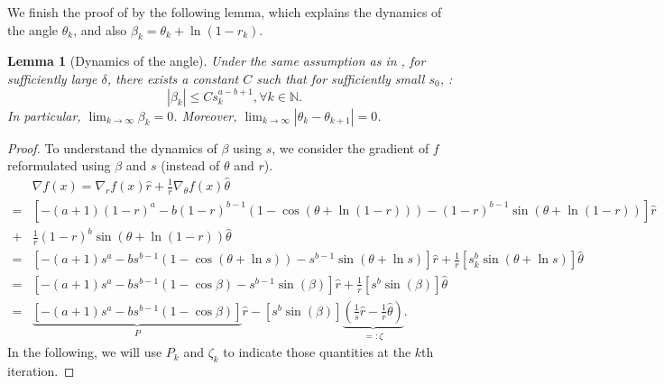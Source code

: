 \documentclass{article}
\theoremstyle{plain}
\newtheorem{lemma}[theorem]{Lemma}
\theoremstyle{definition}
\theoremstyle{remark}
\newcommand*{\NN}{\mathbb{N}}
\begin{document}
We finish the proof of  by the following lemma, which explains the dynamics of the angle $\theta_k$, and also $\beta_k = \theta_k + \ln(1 - r_k)$.
\begin{lemma}[Dynamics of the angle]
    \label{lemma:dynamics-angle}
    Under the same assumption as in , for sufficiently large $\delta$, there exists a constant $C$ such that for sufficiently small $s_0$, :
    \begin{equation*}
        |\beta_k| \leq C s_k^{a - b + 1}, \forall k \in \NN.
    \end{equation*}
    In particular, $\lim_{k \to \infty} \beta_k = 0$. Moreover, $\lim_{k \to \infty} |\theta_k - \theta_{k+1}| = 0$.
\end{lemma}
\begin{proof}
    To understand the dynamics of $\beta$ using $s$, we consider the gradient of $f$ reformulated using $\beta$ and $s$ (instead of $\theta$ and $r$).
    \begin{equation*}
        \begin{aligned}
            &\nabla f(x) = \nabla_r f(x) \hat{r} + \frac{1}{r} \nabla_\theta f(x) \hat{\theta}\\
            =& [-(a+1)(1 - r)^{a} - b(1-r)^{b-1}(1 - \cos(\theta + \ln(1 - r))) - (1 - r)^{b - 1}\sin(\theta + \ln(1 - r))] \hat{r} \\
            +& \frac{1}{r}(1 - r)^b \sin(\theta + \ln(1-r)) \hat{\theta}\\
            =& \left[-(a+1)s^{a} - bs^{b-1}(1 - \cos(\theta + \ln s)) - s^{b - 1}\sin(\theta + \ln s)\right] \hat{r} + \frac{1}{r}\left[s_k^b \sin(\theta + \ln s)\right] \hat{\theta}\\
            =& \left[-(a+1)s^{a} - bs^{b-1}(1 - \cos\beta) - s^{b - 1}\sin(\beta)\right] \hat{r} + \frac{1}{r}\left[s^b \sin(\beta)\right] \hat{\theta}\\
            =&\underbrace{\left[-(a+1)s^{a} - bs^{b-1}(1 - \cos\beta)\right]}_{P} \hat{r} - \left[s^b \sin(\beta)\right]\underbrace{\left(\frac{1}{s}\hat{r} - \frac{1}{r}\hat{\theta}\right)}_{=:\zeta}.
        \end{aligned}
    \end{equation*}
    In the following, we will use $P_k$ and $\zeta_k$ to indicate those quantities at the $k$th iteration. 
    

\end{proof}
\end{document}
